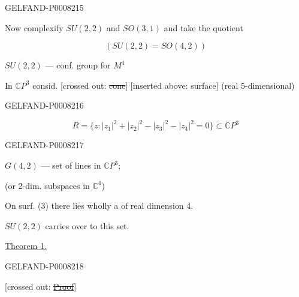 \begin{GelfandAdjacentEvidence}{GELFAND-P000821}{5}


Now complexify \(SU(2,2)\) and \(SO(3,1)\) and take the quotient

\begin{equation*}
(SU(2,2)=SO(4,2))\tag{2}
\end{equation*}

\(SU(2,2)\) — conf. group for \(M^4\)


In \(\mathbb{C}P^3\) consid. [crossed out: \sout{cone}]
[inserted above: surface] (real 5-dimensional)
\end{GelfandAdjacentEvidence}
\begin{GelfandAdjacentEvidence}{GELFAND-P000821}{6}


\begin{equation*}
R=\{z:|z_1|^2+|z_2|^2-|z_3|^2-|z_4|^2=0\}\subset\mathbb{C}P^3
\tag{3}
\end{equation*}

\end{GelfandAdjacentEvidence}
\begin{GelfandAdjacentEvidence}{GELFAND-P000821}{7}


\(G(4,2)\) — set of lines in \(\mathbb{C}P^3\);

(or 2-dim. subspaces in \(\mathbb{C}^4\))

On surf. (3) there lies wholly a  of real dimension 4.

\(SU(2,2)\) carries over to this set.

\uline{Theorem 1.} 
\end{GelfandAdjacentEvidence}
\begin{GelfandAdjacentEvidence}{GELFAND-P000821}{8}


[crossed out: \sout{\uline{Proof}}]
\end{GelfandAdjacentEvidence}


